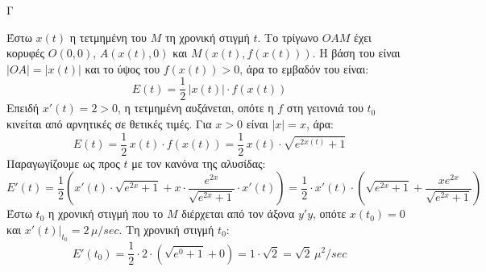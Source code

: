 \begin{thema}{Γ}
\begin{erwthma}
\item Έστω $x(t)$ η τετμημένη του $M$ τη χρονική στιγμή $t$. Το τρίγωνο $OAM$ έχει κορυφές $O(0,0)$, $A(x(t),0)$ και $M(x(t),f(x(t)))$. Η βάση του είναι $|OA|=|x(t)|$ και το ύψος του $f(x(t))>0$, άρα το εμβαδόν του είναι:
\[E(t)=\frac{1}{2}\,|x(t)|\cdot f(x(t))\]
Επειδή $x'(t)=2>0$, η τετμημένη αυξάνεται, οπότε η $f$ στη γειτονιά του $t_0$ κινείται από αρνητικές σε θετικές τιμές. Για $x>0$ είναι $|x|=x$, άρα:
\[E(t)=\frac{1}{2}\,x(t)\cdot f(x(t))=\frac{1}{2}\,x(t)\cdot\sqrt{e^{2x(t)}+1}\]
Παραγωγίζουμε ως προς $t$ με τον κανόνα της αλυσίδας:
\[E'(t)=\frac{1}{2}\left(x'(t)\cdot\sqrt{e^{2x}+1}+x\cdot\frac{e^{2x}}{\sqrt{e^{2x}+1}}\cdot x'(t)\right)=\frac{1}{2}\cdot x'(t)\cdot\left(\sqrt{e^{2x}+1}+\frac{xe^{2x}}{\sqrt{e^{2x}+1}}\right)\]
Έστω $t_0$ η χρονική στιγμή που το $M$ διέρχεται από τον άξονα $y'y$, οπότε $x(t_0)=0$ και $x'(t)\big|_{t_0}=2\,\mu/\si{sec}$. Τη χρονική στιγμή $t_0$:
\[E'(t_0)=\frac{1}{2}\cdot 2\cdot\left(\sqrt{e^{0}+1}+0\right)=1\cdot\sqrt{2}=\sqrt{2}\,\mu^2/\si{sec}\]
\end{erwthma}
\end{thema}
